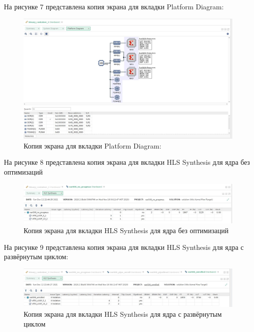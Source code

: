 На рисунке 7 представлена копия экрана для вкладки Platform Diagram:

\FloatBarrier
\begin{figure}[h]
	\begin{center}
		\includegraphics[width=\linewidth]{inc/pldig.png}
	\end{center}
	\caption{Копия экрана для вкладки Platform Diagram:}
\end{figure}
\FloatBarrier

На рисунке 8 представлена копия экрана для вкладки HLS Synthesis для ядра без оптимизаций
\FloatBarrier
\begin{figure}[h]
	\begin{center}
		\includegraphics[width=\linewidth]{inc/hls1.png}
	\end{center}
	\caption{Копия экрана для вкладки HLS Synthesis для ядра без оптимизаций}
\end{figure}
\FloatBarrier

На рисунке 9 представлена копия экрана для вкладки HLS Synthesis для ядра с развёрнутым циклом:
\FloatBarrier
\begin{figure}[h]
	\begin{center}
		\includegraphics[width=\linewidth]{inc/hlsunroll.png}
	\end{center}
	\caption{Копия экрана для вкладки HLS Synthesis для ядра с развёрнутым циклом}
\end{figure}
\FloatBarrier

